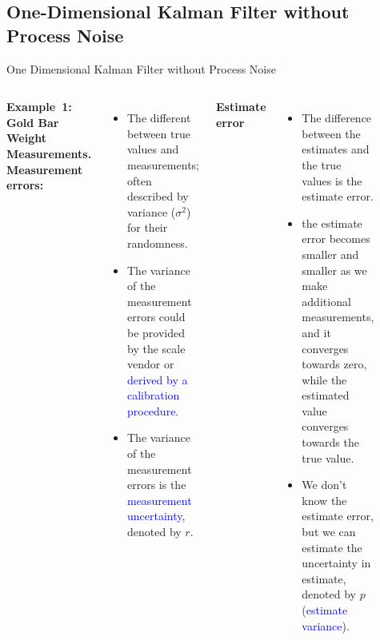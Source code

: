 \subsection{One-Dimensional Kalman Filter without Process Noise}
\begin{frame}{One Dimensional Kalman Filter without Process Noise}
\begin{columns}

\textbf{Example~1: Gold Bar Weight Measurements.}\\
\textbf{Measurement errors:}
\begin{itemize}
    \item The different between true values and measurements; often described by variance ($\sigma^2$) for their randomness.
    \item The variance of the measurement errors could be provided by the scale vendor or \textcolor{blue}{derived by a calibration procedure}.
    \item The variance of the measurement errors is the \textcolor{blue}{measurement uncertainty}, denoted by $r$.
\end{itemize}
\textbf{Estimate error}
\begin{itemize}
    \item The difference between the estimates and the true values is the estimate error. 
    \item the estimate error becomes smaller and smaller as we make additional measurements, and it converges towards zero, while the estimated value converges towards the true value. 
    \item We don't know the estimate error, but we can estimate the uncertainty in estimate, denoted by $p$ (\textcolor{blue}{estimate variance}).
\end{itemize}
	            \begin{figure}
		    \centering
		   \includegraphics[width=1\textwidth]{Figures/Chapter1/ex1_estimationAlgorithm.eps}

\end{figure}
\end{columns}
\end{frame}
